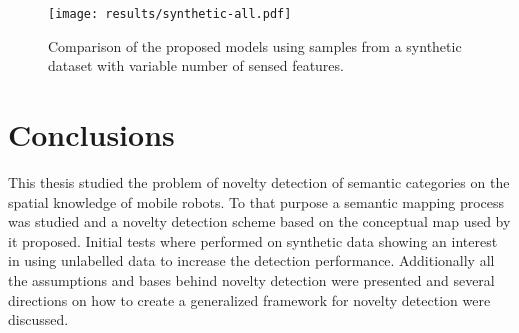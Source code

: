 \documentclass[9pt,a4paper]{extarticle}
\begin{document}
\begin{multicols}{2}
\begin{figure}[H]
\centering
\texttt{[image: results/synthetic-all.pdf]}
\caption{\label{fig:results}Comparison of the proposed models using samples from a synthetic dataset
         with variable number of sensed features.}
\end{figure}

\section{Conclusions}
This thesis studied the problem of novelty detection of semantic categories on the spatial knowledge
of mobile robots. To that purpose a semantic mapping process~\cite{pronobis2011semmap} was studied and
a novelty detection scheme based on the conceptual map used by it proposed.
Initial tests where performed on synthetic data showing an interest in using unlabelled data to
increase the detection performance.
Additionally all the assumptions and bases behind novelty detection were presented and several
directions on how to create a generalized framework for novelty detection were discussed.





\end{multicols}
\end{document}
